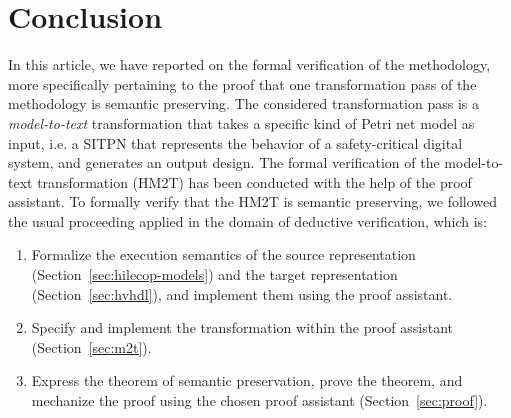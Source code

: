 \documentclass[pdflatex,sn-mathphys]{sn-jnl}%
\theoremstyle{thmstyleone}%
\theoremstyle{thmstyletwo}%
\theoremstyle{thmstylethree}%
\begin{document}
\section{Conclusion}
\label{sec:concl}

In this article, we have reported on the formal verification of the
\hilecop{} methodology, more specifically pertaining to the proof that
one transformation pass of the methodology is semantic preserving.
The considered transformation pass is a \textit{model-to-text}
transformation that takes a specific kind of Petri net model as input,
i.e. a SITPN that represents the behavior of a safety-critical digital
system, and generates an output \vhdl{} design. The formal
verification of the \hilecop{} model-to-text transformation (HM2T) has
been conducted with the help of the \coq{} proof assistant.  To
formally verify that the HM2T is semantic preserving, we followed the
usual proceeding applied in the domain of deductive verification,
which is:
\begin{enumerate}
\item Formalize the execution semantics of the source representation
  (Section~\ref{sec:hilecop-models}) and the target representation
  (Section~\ref{sec:hvhdl}), and implement them using the proof
  assistant.
\item Specify and implement the transformation within the proof
  assistant (Section~\ref{sec:m2t}).
\item Express the theorem of semantic preservation, prove the theorem,
  and mechanize the proof using the chosen proof assistant
  (Section~\ref{sec:proof}).
\end{enumerate}

\bigskip

\end{document}
